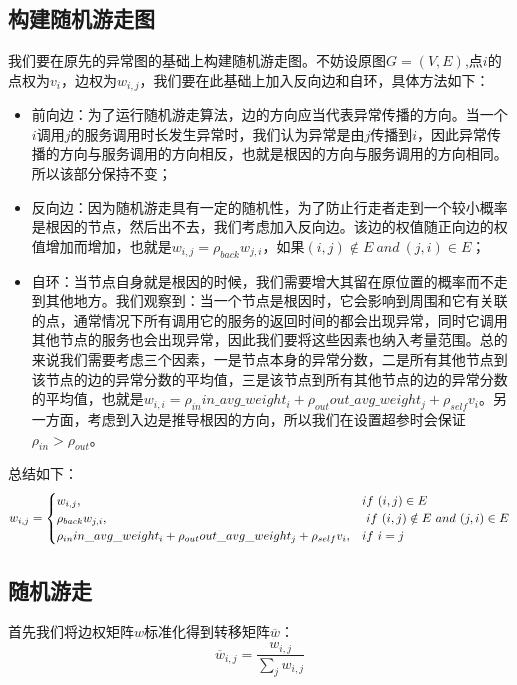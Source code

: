 \subsection{构建随机游走图}
我们要在原先的异常图的基础上构建随机游走图。不妨设原图$G=(V,E)$,点$i$的点权为$v_i$，边权为$w_{i,j}$，我们要在此基础上加入反向边和自环，具体方法如下：
\begin{itemize}
  \item 前向边：为了运行随机游走算法，边的方向应当代表异常传播的方向。当一个$i$调用$j$的服务调用时长发生异常时，我们认为异常是由$j$传播到$i$，因此异常传播的方向与服务调用的方向相反，也就是根因的方向与服务调用的方向相同。所以该部分保持不变；
  \item 反向边：因为随机游走具有一定的随机性，为了防止行走者走到一个较小概率是根因的节点，然后出不去，我们考虑加入反向边。该边的权值随正向边的权值增加而增加，也就是$w_{i,j} = \rho_{back} w_{j,i}$，如果$(i,j) \notin E\ and\  (j,i) \in E$；
  \item 自环：当节点自身就是根因的时候，我们需要增大其留在原位置的概率而不走到其他地方。我们观察到：当一个节点是根因时，它会影响到周围和它有关联的点，通常情况下所有调用它的服务的返回时间的都会出现异常，同时它调用其他节点的服务也会出现异常，因此我们要将这些因素也纳入考量范围。总的来说我们需要考虑三个因素，一是节点本身的异常分数，二是所有其他节点到该节点的边的异常分数的平均值，三是该节点到所有其他节点的边的异常分数的平均值，也就是$w_{i,i} = \rho_{in} in\_avg\_weight_{i} + \rho_{out} out\_avg\_weight_{j}+ \rho_{self}  v_i$。另一方面，考虑到入边是推导根因的方向，所以我们在设置超参时会保证$\rho_{in}>\rho_{out}$。
\end{itemize}

总结如下：
\begin{equation}
w_{i,j} = \begin{cases} w_{i,j}, & if\ (i,j) \in E \cr \rho_{back} w_{j,i}, &\ if\ (i,j) \notin E\ and\  (j,i) \in E \cr \rho_{in} in\_avg\_weight_{i} + \rho_{out} out\_avg\_weight_{j}+ \rho_{self}  v_i, & if\ i=j \end{cases}
\end{equation}

\subsection{随机游走}
首先我们将边权矩阵$w$标准化得到转移矩阵$\overline{w}$：
\begin{equation}
  \overline{w}_{i,j} = \frac{w_{i,j}}{\sum_jw_{i,j}}
\end{equation}

